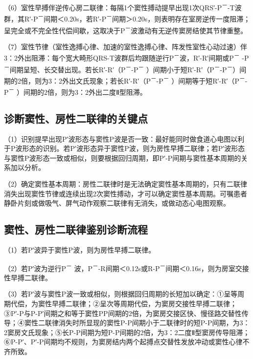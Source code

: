 （6）室性早搏伴逆传心房二联律：每隔1个窦性搏动提早出现1次QRS′-P\textsuperscript{－}-T波群，其R′-P\textsuperscript{－}间期＜0.20s，若R′-P\textsuperscript{－}间期＞0.20s，则表明存在室房逆传一度阻滞；呈完全或不完全性代偿间歇，这取决于P\textsuperscript{－}波激动有无逆传窦房结使其节律重整。

（7）室性节律（室性逸搏心律、加速的室性逸搏心律、阵发性室性心动过速）伴3：2外出阻滞：每个宽大畸形QRS-T波群后均跟随逆行P\textsuperscript{－}波，R′-R′间期或P\textsuperscript{－} -P\textsuperscript{－}间期呈短、长交替出现。若长R′-R′（P\textsuperscript{－}-P\textsuperscript{－} ）间期小于短R′-R′（P\textsuperscript{－}-P\textsuperscript{－}）间期的2倍，则为3：2外出文氏现象；若长R′-R′（P\textsuperscript{－}-P\textsuperscript{－} ）间期等于短R′-R′（P\textsuperscript{－}-P\textsuperscript{－} ）间期的2倍，则为3：2外出二度Ⅱ型阻滞。

\protect\hypertarget{text00044.htmlux5cux23subid484}{}{}

\subsection{诊断窦性、房性二联律的关键点}

（1）识别提早出现P′波形态与窦性P波是否一致：最好能同时做食道心电图以利于P波形态的识别。若P′波形态异于窦性P波，则为房性早搏二联律；若P′波形态与窦性P波形态一致或相似，则要根据回归周期，即P′-P间期与窦性基本周期的关系加以分析。

（2）确定窦性基本周期：房性二联律时是无法确定窦性基本周期的，只有二联律消失出现窦性节律或连续出现2次窦性搏动，才可以确定窦性基本周期。可嘱患者静卧片刻或做吸气、屏气动作观察二联律有无消失，或做动态心电图观察。

\protect\hypertarget{text00044.htmlux5cux23subid485}{}{}

\subsection{窦性、房性二联律鉴别诊断流程}

（1）若P′波异于窦性P波，则为房性早搏二联律。

（2）若P′波为逆行P\textsuperscript{－} 波，P\textsuperscript{－}-R间期＜0.12s或R-P\textsuperscript{－}间期＜0.16s，则为房室交接性早搏二联律。

（3）若P′波与窦性P波一致或相似，则根据回归周期的长短加以确定：①呈等周期代偿，为窦性早搏二联律；②呈次等周期代偿，为窦房交接性早搏二联律；③P′-P与P-P′间期之和等于窦性PP间期的2倍，为窦房交接区快、慢径路交替性传导；④窦性二联律消失时所显现的窦性P-P间期小于二联律时的短P-P间期，为3：2窦房文氏现象；⑤长P-P间期为短P-P间期的2倍，为3：2二度Ⅱ型窦房传导阻滞；⑥P-P′、P′-P间期均不规则，为窦房结内两个起搏点交替性发放冲动或窦性心律不齐所致。

